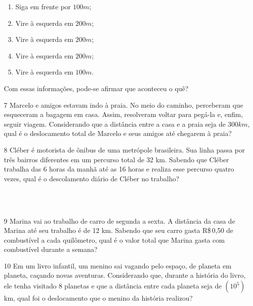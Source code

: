 {{{\begin{enumerate}[itemsep=0pt]
\item Siga em frente por $100 m$;
\item Vire à esquerda em $200 m$;
\item Vire à esquerda em $200 m$;
\item Vire à esquerda em $200 m$;
\item Vire à esquerda em $100 m$.
\end{enumerate}

Com essas informações, pode-se afirmar que aconteceu o quê?


\num{7} Marcelo e amigos estavam indo à praia. No meio do caminho,
perceberam que esqueceram a bagagem em casa. Assim, resolveram voltar
para pegá-la e, enfim, seguir viagem.
Considerando que a distância entre a casa e a praia seja de $300 km$, qual
é o deslocamento total de Marcelo e seus amigos até chegarem à praia?



\num{8} Cléber é motorista de ônibus de uma metrópole brasileira. Sua linha
passa por três bairros diferentes em um percurso total de 32 km. Sabendo que
Cléber trabalha das 6 horas da manhã até as 16 horas e realiza esse
percurso quatro vezes, qual é o descolamento diário de Cléber no trabalho?

\\
\\

\num{9} Marina vai ao trabalho de carro de segunda a sexta. A distância da
casa de Marina até seu trabalho é de 12 km. Sabendo que seu carro gasta
R\$\,0,50 de combustível a cada quilômetro, qual é o valor total que Marina
gasta com combustível durante a semana?


\num{10} Em um livro infantil, um menino sai vagando pelo espaço, de planeta
em planeta, caçando novas aventuras. Considerando que, durante a
história do livro, ele tenha visitado 8 planetas e que a distância
entre cada planeta seja de $(10^5)$ km, qual foi o deslocamento que o
menino da história realizou?

}}}
